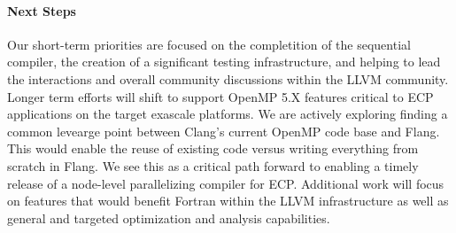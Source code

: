 \paragraph{Next Steps}
Our short-term priorities are focused on the completition of the
sequential compiler, the creation of a significant testing
infrastructure, and helping to lead the interactions and overall
community discussions within the LLVM community.  Longer term efforts
will shift to support OpenMP 5.X features critical to ECP applications
on the target exascale platforms.  We are actively exploring finding a
common levearge point between Clang's current OpenMP code base and
Flang.  This would enable the reuse of existing code versus writing
everything from scratch in Flang.  We see this as a critical path
forward to enabling a timely release of a node-level parallelizing
compiler for ECP.  Additional work will focus on features that would
benefit Fortran within the LLVM infrastructure as well as general and
targeted optimization and analysis capabilities.

